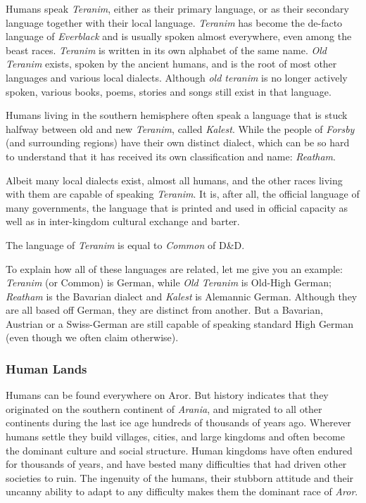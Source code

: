 Humans speak \emph{Teranim}, either as their primary language, or as their
secondary language together with their local language. \emph{Teranim} has
become the de-facto language of \emph{Everblack} and is usually spoken almost
everywhere, even among the beast races. \emph{Teranim} is written in its own
alphabet of the same name. \emph{Old Teranim} exists, spoken by the ancient
humans, and is the root of most other languages and various local dialects.
Although \emph{old teranim} is no longer actively spoken, various books,
poems, stories and songs still exist in that language.

Humans living in the southern hemisphere often speak a language that is
stuck halfway between old and new \emph{Teranim}, called \emph{Kalest}. While
the people of \emph{Forsby} (and surrounding regions) have their own distinct
dialect, which can be so hard to understand that it has received its own
classification and name: \emph{Reatham}.

Albeit many local dialects exist, almost all humans, and the other races
living with them are capable of speaking \emph{Teranim}. It is, after all,
the official language of many governments, the language that is printed and
used in official capacity as well as in inter-kingdom cultural exchange and
barter.

\begin{35e}
The language of \emph{Teranim} is equal to \emph{Common} of D\&D.
\end{35e}

\begin{note}
To explain how all of these languages are related, let me give you an example:
\emph{Teranim} (or Common) is German, while \emph{Old Teranim} is Old-High
German; \emph{Reatham} is the Bavarian dialect and \emph{Kalest} is Alemannic
German. Although they are all based off German, they are distinct from
another. But a Bavarian, Austrian or a Swiss-German are still capable of
speaking standard High German (even though we often claim otherwise).
\end{note}

\subsubsection*{Human Lands}

Humans can be found everywhere on Aror. But history indicates that they
originated on the southern continent of \emph{Arania}, and migrated to all
other continents during the last ice age hundreds of thousands of years
ago. Wherever humans settle they build villages, cities, and large kingdoms
and often become the dominant culture and social structure. Human kingdoms
have often endured for thousands of years, and have bested many difficulties
that had driven other societies to ruin.  The ingenuity of the humans, their
stubborn attitude and their uncanny ability to adapt to any difficulty makes
them the dominant race of \emph{Aror}.

